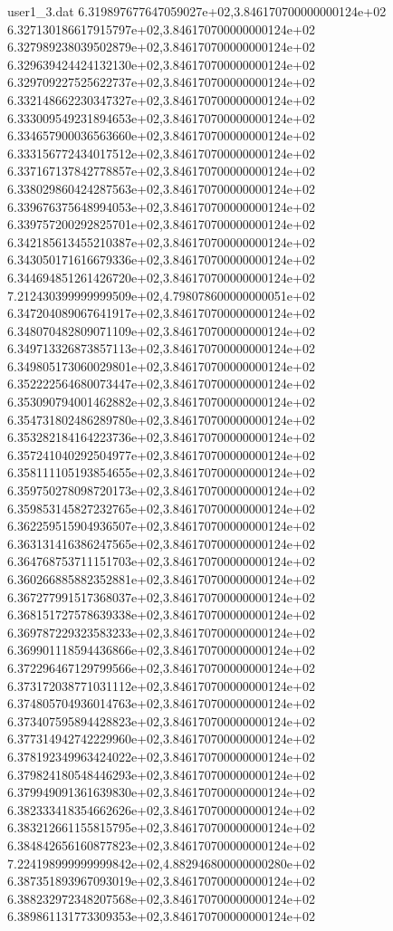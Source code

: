 \begin{filecontents}{user1_3.dat}
6.319897677647059027e+02,3.846170700000000124e+02
6.327130186617915797e+02,3.846170700000000124e+02
6.327989238039502879e+02,3.846170700000000124e+02
6.329639424424132130e+02,3.846170700000000124e+02
6.329709227525622737e+02,3.846170700000000124e+02
6.332148662230347327e+02,3.846170700000000124e+02
6.333009549231894653e+02,3.846170700000000124e+02
6.334657900036563660e+02,3.846170700000000124e+02
6.333156772434017512e+02,3.846170700000000124e+02
6.337167137842778857e+02,3.846170700000000124e+02
6.338029860424287563e+02,3.846170700000000124e+02
6.339676375648994053e+02,3.846170700000000124e+02
6.339757200292825701e+02,3.846170700000000124e+02
6.342185613455210387e+02,3.846170700000000124e+02
6.343050171616679336e+02,3.846170700000000124e+02
6.344694851261426720e+02,3.846170700000000124e+02
7.212430399999999509e+02,4.798078600000000051e+02
6.347204089067641917e+02,3.846170700000000124e+02
6.348070482809071109e+02,3.846170700000000124e+02
6.349713326873857113e+02,3.846170700000000124e+02
6.349805173060029801e+02,3.846170700000000124e+02
6.352222564680073447e+02,3.846170700000000124e+02
6.353090794001462882e+02,3.846170700000000124e+02
6.354731802486289780e+02,3.846170700000000124e+02
6.353282184164223736e+02,3.846170700000000124e+02
6.357241040292504977e+02,3.846170700000000124e+02
6.358111105193854655e+02,3.846170700000000124e+02
6.359750278098720173e+02,3.846170700000000124e+02
6.359853145827232765e+02,3.846170700000000124e+02
6.362259515904936507e+02,3.846170700000000124e+02
6.363131416386247565e+02,3.846170700000000124e+02
6.364768753711151703e+02,3.846170700000000124e+02
6.360266885882352881e+02,3.846170700000000124e+02
6.367277991517368037e+02,3.846170700000000124e+02
6.368151727578639338e+02,3.846170700000000124e+02
6.369787229323583233e+02,3.846170700000000124e+02
6.369901118594436866e+02,3.846170700000000124e+02
6.372296467129799566e+02,3.846170700000000124e+02
6.373172038771031112e+02,3.846170700000000124e+02
6.374805704936014763e+02,3.846170700000000124e+02
6.373407595894428823e+02,3.846170700000000124e+02
6.377314942742229960e+02,3.846170700000000124e+02
6.378192349963424022e+02,3.846170700000000124e+02
6.379824180548446293e+02,3.846170700000000124e+02
6.379949091361639830e+02,3.846170700000000124e+02
6.382333418354662626e+02,3.846170700000000124e+02
6.383212661155815795e+02,3.846170700000000124e+02
6.384842656160877823e+02,3.846170700000000124e+02
7.224198999999999842e+02,4.882946800000000280e+02
6.387351893967093019e+02,3.846170700000000124e+02
6.388232972348207568e+02,3.846170700000000124e+02
6.389861131773309353e+02,3.846170700000000124e+02

\end{filecontents}
